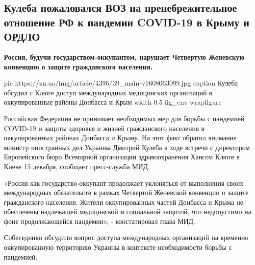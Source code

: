 
 
 
 
 
 
\subsection{Кулеба пожаловался ВОЗ на пренебрежительное отношение РФ к пандемии COVID-19 в Крыму и ОРДЛО}
\label{sec:15_12_2020.news.ua.zn.1.kuleba_russia_covid}

\textbf{Россия, будучи государством-оккупантом, нарушает Четвертую Женевскую конвенцию
о защите гражданского населения.} 

\ifcmt
  pic https://zn.ua/img/article/4396/39_main-v1608063099.jpg
  caption Кулеба обсудил с Клюге доступ международных медицинских организаций в оккупированные районы Донбасса и Крым
  width 0.5
  fig_env wrapfigure
\fi

Российская Федерация не принимает необходимых мер для борьбы с пандемией
COVID-19 и защиты здоровья и жизней гражданского населения в оккупированных
районах Донбасса и Крыму. На этот факт обратил внимание министр иностранных дел
Украины Дмитрий Кулеба в ходе встречи с директором Европейского бюро Всемирной
организации здравоохранения Хансом Клюге в Киеве 15 декабря, сообщает
пресс-служба МИД.

«Россия как государство-оккупант продолжает уклоняться от выполнения своих
международных обязательств в рамках Четвертой Женевской конвенции о защите
гражданского населения. Жители оккупированных частей Донбасса и Крыма не
обеспечены надлежащей медицинской и социальной защитой, что недопустимо на фоне
продолжающейся пандемии», - констатировал глава МИД.

Собеседники обсудили вопрос доступа международных организаций на временно
оккупированную территорию Украины в контексте необходимости борьбы с пандемией.

